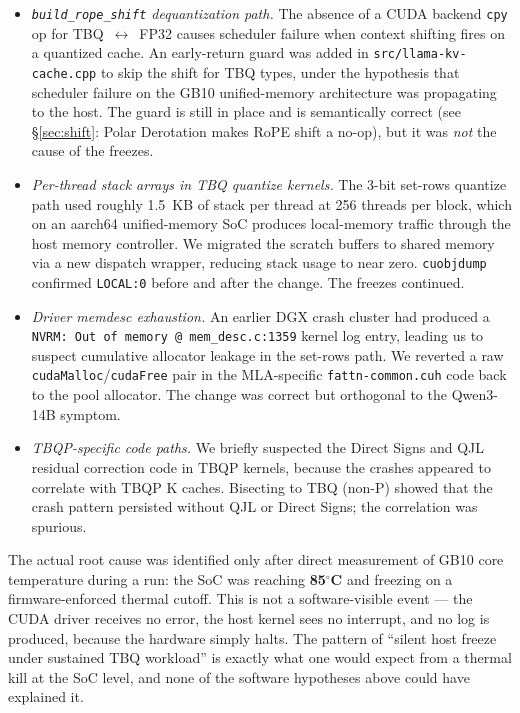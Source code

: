 \documentclass[10pt,twocolumn]{article}
\begin{document}
\begin{itemize}[leftmargin=*,topsep=1pt,itemsep=1pt]
\item \emph{\texttt{build\_rope\_shift} dequantization path.} The absence of a CUDA backend \texttt{cpy} op for TBQ~$\leftrightarrow$~FP32 causes scheduler failure when context shifting fires on a quantized cache. An early-return guard was added in \texttt{src/llama-kv-cache.cpp} to skip the shift for TBQ types, under the hypothesis that scheduler failure on the GB10 unified-memory architecture was propagating to the host. The guard is still in place and is semantically correct (see \S\ref{sec:shift}: Polar Derotation makes RoPE shift a no-op), but it was \emph{not} the cause of the freezes.
\item \emph{Per-thread stack arrays in TBQ quantize kernels.} The 3-bit set-rows quantize path used roughly 1.5~KB of stack per thread at 256 threads per block, which on an aarch64 unified-memory SoC produces local-memory traffic through the host memory controller. We migrated the scratch buffers to shared memory via a new dispatch wrapper, reducing stack usage to near zero. \texttt{cuobjdump} confirmed \texttt{LOCAL:0} before and after the change. The freezes continued.
\item \emph{Driver memdesc exhaustion.} An earlier DGX crash cluster had produced a \texttt{NVRM: Out of memory @ mem\_desc.c:1359} kernel log entry, leading us to suspect cumulative allocator leakage in the set-rows path. We reverted a raw \texttt{cudaMalloc}/\texttt{cudaFree} pair in the MLA-specific \texttt{fattn-common.cuh} code back to the pool allocator. The change was correct but orthogonal to the Qwen3-14B symptom.
\item \emph{TBQP-specific code paths.} We briefly suspected the Direct Signs and QJL residual correction code in TBQP kernels, because the crashes appeared to correlate with TBQP K caches. Bisecting to TBQ (non-P) showed that the crash pattern persisted without QJL or Direct Signs; the correlation was spurious.
\end{itemize}

The actual root cause was identified only after direct measurement of GB10 core temperature during a run: the SoC was reaching \textbf{85$^\circ$C} and freezing on a firmware-enforced thermal cutoff. This is not a software-visible event --- the CUDA driver receives no error, the host kernel sees no interrupt, and no log is produced, because the hardware simply halts. The pattern of ``silent host freeze under sustained TBQ workload'' is exactly what one would expect from a thermal kill at the SoC level, and none of the software hypotheses above could have explained it.
\end{document}
